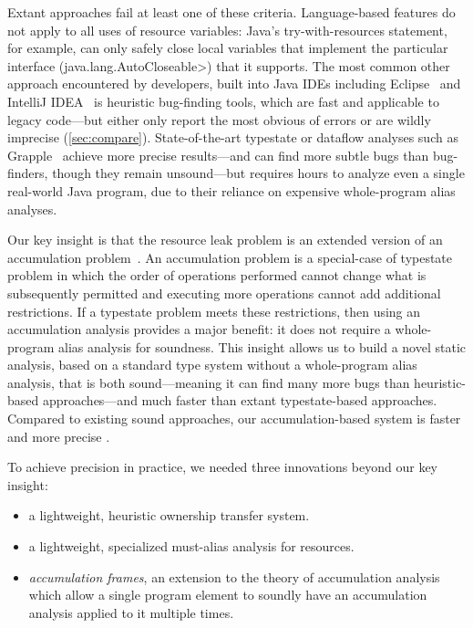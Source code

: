 Extant approaches fail at least one of these criteria.
Language-based features do not apply to all uses of resource variables:
Java's try-with-resources statement, for example, can
only safely close local variables that implement the particular
interface (\<java.lang.AutoCloseable>) that it supports.
The most common other
approach encountered by developers, built into Java IDEs including
Eclipse~\cite{ecj-resource-leak} and IntelliJ
IDEA~\cite{idea-resource-leak} is heuristic bug-finding tools, which
are fast and applicable to legacy code---but either only report the most obvious of
errors or are wildly imprecise (\cref{sec:compare}).
State-of-the-art typestate or dataflow analyses such as
Grapple~\cite{zuo2019grapple} achieve more precise results---and
can find more subtle bugs than bug-finders, though they remain unsound---but
requires hours to analyze even a single real-world Java program, due
to their reliance on expensive whole-program alias analyses.

Our key insight is that the resource leak problem is an extended
version of an accumulation problem~\cite{kellogg20verifying}. An
accumulation problem is a special-case of typestate problem
in which the order of operations performed cannot change what
is subsequently permitted and executing more operations cannot
add additional restrictions.
If a typestate problem meets these restrictions, then using an accumulation
analysis provides a major benefit: it does
not require a whole-program alias analysis for soundness.
This insight allows us to build a novel static analysis, based on a
standard type system without a whole-program alias analysis, that is
both sound---meaning it can find many more bugs than heuristic-based
approaches---and much faster than extant typestate-based approaches.
Compared to existing sound approaches, our accumulation-based system
is faster and more precise .

To achieve precision in practice, we needed three
innovations beyond our key insight:
\begin{itemize}
\item a lightweight, heuristic ownership transfer system.
\item a lightweight, specialized must-alias analysis for resources.
\item \emph{accumulation frames}, an extension to the theory of
  accumulation analysis which allow a single program element to
  soundly have an accumulation analysis applied to it multiple times.
\end{itemize}


